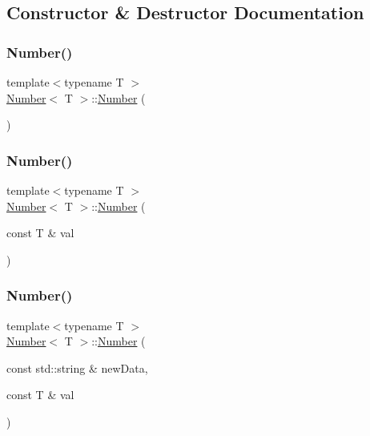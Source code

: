 \subsection{Constructor \& Destructor Documentation}
\mbox{\label{class_number_a6313577241e4023392abfd7d3696f791}} 
\subsubsection{\texorpdfstring{Number()}{Number()}\hspace{0.1cm}{\footnotesize\ttfamily [1/3]}}
{\footnotesize\ttfamily template$<$typename T $>$ \\
\mbox{\hyperlink{class_number}{Number}}$<$ T $>$\+::\mbox{\hyperlink{class_number}{Number}} (\begin{DoxyParamCaption}{ }\end{DoxyParamCaption})}

\mbox{\label{class_number_a15c51691afe36b9f0747517b4d322885}} 
\subsubsection{\texorpdfstring{Number()}{Number()}\hspace{0.1cm}{\footnotesize\ttfamily [2/3]}}
{\footnotesize\ttfamily template$<$typename T $>$ \\
\mbox{\hyperlink{class_number}{Number}}$<$ T $>$\+::\mbox{\hyperlink{class_number}{Number}} (\begin{DoxyParamCaption}\item[{const T \&}]{val }\end{DoxyParamCaption})}

\mbox{\label{class_number_a4c7243d311175b965fbe32b22980151f}} 
\subsubsection{\texorpdfstring{Number()}{Number()}\hspace{0.1cm}{\footnotesize\ttfamily [3/3]}}
{\footnotesize\ttfamily template$<$typename T $>$ \\
\mbox{\hyperlink{class_number}{Number}}$<$ T $>$\+::\mbox{\hyperlink{class_number}{Number}} (\begin{DoxyParamCaption}\item[{const std\+::string \&}]{new\+Data,  }\item[{const T \&}]{val }\end{DoxyParamCaption})\hspace{0.3cm}{\ttfamily [inline]}}

